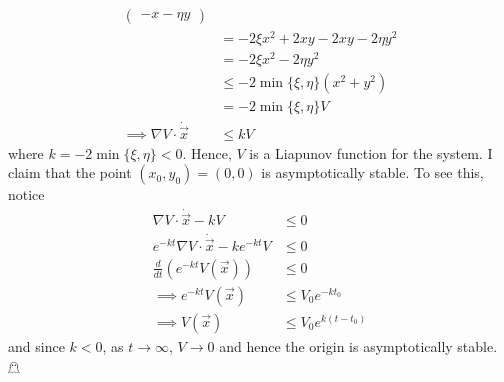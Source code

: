 \documentclass{article}
\begin{document}
\begin{itemize}
\begin{align*}
\begin{pmatrix}
            -x - \eta y
        \end{pmatrix}\\
        &= -2\xi x^2 + 2xy - 2xy - 2\eta y^2\\
        &= -2\xi x^2 - 2\eta y^2\\
        &\leq -2\min\{\xi, \eta\}(x^2 + y^2)\\
        &= -2\min\{\xi, \eta\}V\\
        \implies \nabla V \cdot \dot{\vec{x}} &\leq kV
    \end{align*}
    where $k = -2\min\{\xi, \eta\} < 0$. Hence, $V$ is a Liapunov function for the system. I claim that the point $(x_0,y_0) = (0,0)$ is asymptotically stable. To see this, notice
    \begin{align*}
        \nabla V \cdot \dot{\vec{x}} - kV &\leq 0\\
        e^{-kt}\nabla V \cdot \dot{\vec{x}} - ke^{-kt}V &\leq 0\\
        \frac{d}{dt}\left(e^{-kt}V(\vec{x})\right) &\leq 0\\
        \implies e^{-kt}V(\vec{x}) &\leq V_0e^{-kt_0}\\
        \implies V(\vec{x}) &\leq V_0e^{k(t - t_0)}
    \end{align*}
    and since $k < 0$, as $t \to \infty$, $V \to 0$ and hence the origin is asymptotically stable.
    \hfill $\mathghost$
    
    
\end{itemize}
\pagebreak
\end{document}
